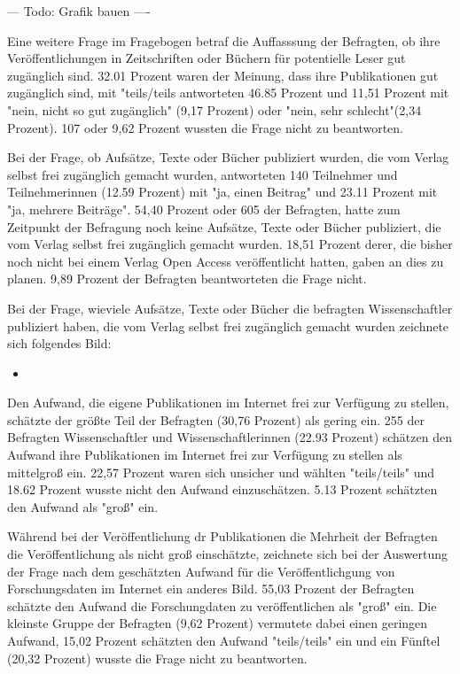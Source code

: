 --- Todo: Grafik bauen ----

Eine weitere Frage im Fragebogen betraf die Auffasssung der Befragten, ob ihre Veröffentlichungen in Zeitschriften oder Büchern für potentielle Leser gut zugänglich sind. 32.01 Prozent waren der Meinung, dass ihre Publikationen gut zugänglich sind, mit "teils/teils antworteten 46.85 Prozent und 11,51 Prozent mit "nein, nicht so gut zugänglich" (9,17 Prozent) oder "nein, sehr schlecht"(2,34 Prozent). 107 oder 9,62 Prozent wussten die Frage nicht zu beantworten.

Bei der Frage, ob Aufsätze, Texte oder Bücher publiziert wurden, die vom Verlag selbst frei zugänglich gemacht wurden, antworteten 140 Teilnehmer und Teilnehmerinnen (12.59 Prozent) mit "ja, einen Beitrag" und 23.11 Prozent mit "ja, mehrere Beiträge". 54,40 Prozent oder 605 der Befragten, hatte zum Zeitpunkt der Befragung noch keine Aufsätze, Texte oder Bücher publiziert, die vom Verlag selbst frei zugänglich gemacht wurden.  18,51 Prozent derer, die bisher noch nicht bei einem Verlag Open Access veröffentlicht hatten, gaben an dies zu planen. 9,89 Prozent der Befragten beantworteten die Frage nicht.  	 

Bei der Frage, wieviele Aufsätze, Texte oder Bücher die befragten Wissenschaftler publiziert haben, die vom Verlag selbst frei zugänglich gemacht wurden zeichnete sich folgendes Bild:
\begin{itemize}
\item 
\end{itemize}

Den Aufwand, die eigene Publikationen im Internet frei zur Verfügung zu stellen, schätzte der größte Teil der Befragten (30,76 Prozent) als gering ein. 255 der Befragten Wissenschaftler und Wissenschaftlerinnen (22.93 Prozent) schätzen den Aufwand ihre Publikationen im Internet frei zur Verfügung zu stellen als mittelgroß ein.  22,57 Prozent waren sich unsicher und wählten "teils/teils" und 18.62 Prozent wusste nicht den Aufwand einzuschätzen. 5.13 Prozent schätzten den Aufwand als "groß" ein.

Während bei der Veröffentlichung dr Publikationen die Mehrheit der Befragten die Veröffentlichung als nicht groß einschätzte, zeichnete sich bei der Auswertung der Frage nach dem geschätzten Aufwand für die Veröffentlichgung von Forschungsdaten im Internet ein anderes Bild. 55,03 Prozent der Befragten schätzte den Aufwand die Forschungdaten zu veröffentlichen als "groß" ein. Die kleinste Gruppe der Befragten (9,62 Prozent) vermutete dabei einen geringen Aufwand, 15,02 Prozent schätzten den Aufwand "teils/teils" ein und ein Fünftel (20,32 Prozent) wusste die Frage nicht zu beantworten.

